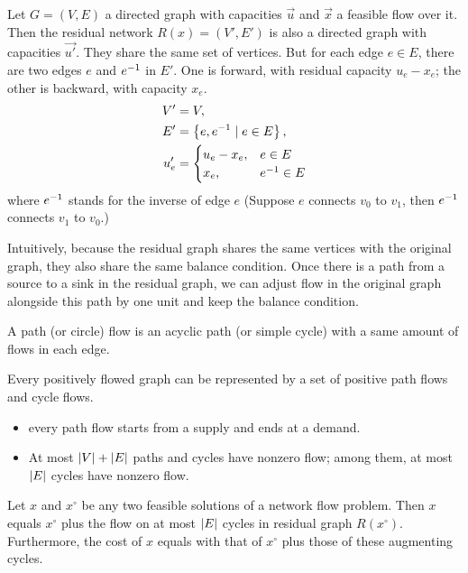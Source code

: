 \documentclass[UTF8,a4paper]{ctexart}
\begin{document}
\begin{definition}
    Let $G=(V, E)$ a directed graph with capacities $\vec{u}$ and $\vec{x}$ a feasible flow over it.
    Then the residual network $R(x)=(V', E')$ is also a directed graph with capacities $\vec{u'}$.
    They share the same set of vertices.
    But for each edge $e\in E$, there are two edges $e$ and ${e}^{-1}$ in $E'$.
    One is forward, with residual capacity $u_e-x_e$;
    the other is backward, with capacity $x_e$.
    \begin{align*}
        V' &=V,\\
        E' &=\left\{ e,{e}^{-1} \mid e\in E \right\},\\
        u'_e &=\begin{cases}
            u_e-x_e,&e\in E\\
            x_e,&{e}^{-1}\in E
        \end{cases}
    \end{align*}
    where ${e}^{-1}$ stands for the inverse of edge $e$
    (Suppose $e$ connects $v_0$ to $v_1$, then ${e}^{-1}$ connects $v_1$ to $v_0$.)

    Intuitively, because the residual graph shares the same vertices with the original graph,
    they also share the same balance condition.
    Once there is a path from a source to a sink in the residual graph,
    we can adjust flow in the original graph alongside this path by one unit and keep the balance condition.
\end{definition}

\begin{definition}
    A path (or circle) flow is an acyclic path (or simple cycle) with a same amount of flows in each edge.
\end{definition}

\begin{lemma}
    Every positively flowed graph can be represented by a set of positive path flows and cycle flows.
    \begin{itemize}
        \item every path flow starts from a supply and ends at a demand.
        \item At most $\left| V \right|+\left| E \right|$ paths and cycles have nonzero flow; among them, at most $\left| E \right|$ cycles have nonzero flow.
    \end{itemize}
\end{lemma}

\begin{lemma}
    Let $x$ and $x^\circ$ be any two feasible solutions of a network flow problem.
    Then $x$ equals $x^\circ$ plus the flow on at most $\left| E \right|$ cycles in residual graph $R(x^\circ)$.
    Furthermore, the cost of $x$ equals with that of $x^\circ$ plus those of these augmenting cycles.
\end{lemma}
\end{document}
